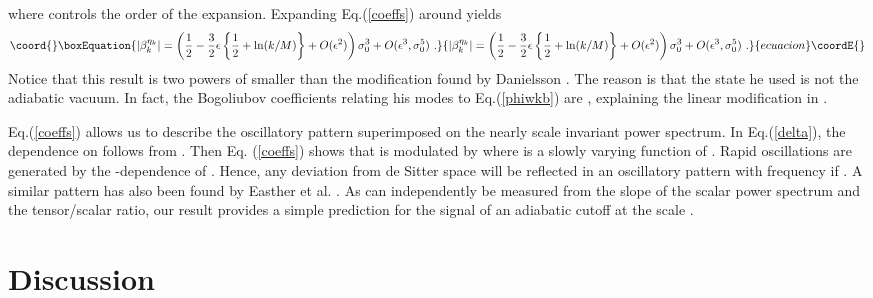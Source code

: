 \documentclass[a4paper,aps,prd,preprint,groupedaddress,nofootinbib]{revtex4}
\begin{document}
where \coordHE{} controls the order of the expansion. Expanding Eq.(\ref{coeffs})
around \coordHE{} yields
\begin{equation}\coord{}\boxEquation{
\label{betaappr}
\vert\beta_k^{\eta_k}\vert = \left(\frac{1}{2} - \frac{3}{2}\epsilon
\left\{ \frac{1}{2}+ \ln(k/M) \right\} + O(\epsilon^2) \right)
\sigma_0^3 + O(\epsilon^3,\sigma_0^5)\,\,.
}{
\vert\beta_k^{\eta_k}\vert = \left(\frac{1}{2} - \frac{3}{2}\epsilon
\left\{ \frac{1}{2}+ \ln(k/M) \right\} + O(\epsilon^2) \right)
\sigma_0^3 + O(\epsilon^3,\sigma_0^5)\,\,.
}{ecuacion}\coordE{}\end{equation}
Notice that this result is two powers of \myHighlight{$\sigma$}\coordHE{} smaller 
than the modification found by Danielsson \cite{D02}. The reason
is that the state he used is not the adiabatic vacuum. 
In fact, the Bogoliubov coefficients relating his modes 
to Eq.(\ref{phiwkb}) are \coordHE{},
explaining the linear modification in \coordHE{}.

Eq.(\ref{coeffs}) allows us to describe the oscillatory pattern
superimposed on the nearly scale invariant power spectrum. In
Eq.(\ref{delta}), the dependence on \coordHE{} follows from
\coordHE{}.  Then Eq. (\ref{coeffs}) shows
that \myHighlight{$\delta$}\coordHE{} is modulated by  \coordHE{} where \coordHE{} 
is a slowly varying function of \coordHE{}. Rapid oscillations are generated
by the \coordHE{}-dependence of \coordHE{}. Hence, any
deviation from de Sitter space will be reflected in an oscillatory
pattern  with frequency \coordHE{} if \coordHE{}. A similar pattern has also been
found by  Easther et al. \cite{Eea01b,Eea02}. As \myHighlight{$\epsilon$}\coordHE{} can
independently be measured from the slope of the scalar power spectrum
and the tensor/scalar ratio, our result provides a simple prediction
for the signal of an adiabatic cutoff at the scale \coordHE{}.

\section{Discussion}
\end{document}
